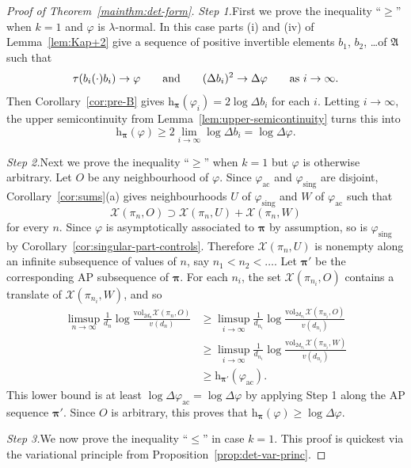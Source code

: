 \documentclass[10pt,a4paper]{amsart}
\newcommand{\A}{\mathfrak{A}}
\newcommand{\X}{\mathcal{X}}
\newcommand{\bspi}{\boldsymbol{\pi}}
\renewcommand{\l}{\lambda}
\renewcommand{\phi}{\varphi}
\renewcommand{\rm}[1]{\mathrm{#1}}
\newcommand{\rmh}{\mathrm{h}}
\newcommand{\vol}{\mathrm{vol}}
\begin{document}
\begin{proof}[Proof of Theorem~\ref{mainthm:det-form}]
\emph{Step 1.}\quad First we prove the inequality ``$\ge$'' when $k=1$ and $\phi$ is $\l$-normal.  In this case parts (i) and (iv) of Lemma~\ref{lem:Kap+2} give a sequence of positive invertible elements $b_1$, $b_2$, \dots of $\A$ such that
\[\tau(b_i(\cdot)b_i) \to \phi \qquad \hbox{and} \qquad (\Delta b_i)^2 \to \Delta \phi \qquad \hbox{as}\ i\to\infty.\]
Then Corollary~\ref{cor:pre-B} gives $\rmh_{\bspi}(\phi_i) = 2\log \Delta b_i$ for each $i$. Letting $i\to \infty$, the upper semicontinuity from Lemma~\ref{lem:upper-semicontinuity} turns this into
\[\rmh_{\bspi}(\phi) \ge 2\lim_{i\to\infty}\log \Delta b_i = \log \Delta \phi.\]

\emph{Step 2.}\quad Next we prove the inequality ``$\ge$'' when $k=1$ but $\phi$ is otherwise arbitrary.  Let $O$ be any neighbourhood of $\phi$.  Since $\phi_{\rm{ac}}$ and $\phi_{\rm{sing}}$ are disjoint,  Corollary~\ref{cor:sums}(a) gives neighbourhoods $U$ of $\phi_{\rm{sing}}$ and $W$ of $\phi_{\rm{ac}}$ such that
\[	\X(\pi_n,O) \supset \X(\pi_n,U) + \X(\pi_n,W)\]
for every $n$.  Since $\phi$ is asymptotically associated to $\bspi$ by assumption, so is $\phi_{\rm{sing}}$ by Corollary~\ref{cor:singular-part-controls}.  Therefore $\X(\pi_n,U)$ is nonempty along an infinite subsequence of values of $n$, say $n_1 < n_2 < \dots$.  Let $\bspi'$ be the corresponding AP subsequence of $\bspi$.  For each $n_i$, the set $\X(\pi_{n_i},O)$ contains a translate of $\X(\pi_{n_i},W)$, and so
\begin{align*}
\limsup_{n\to\infty}\frac{1}{d_n}\log \frac{\vol_{2d_n}\X(\pi_n,O)}{v(d_n)} &\ge\limsup_{i\to\infty}\frac{1}{d_{n_i}}\log \frac{\vol_{2d_{n_i}}\X(\pi_{n_i},O)}{v(d_{n_i})}\\
&\ge \limsup_{i\to\infty}\frac{1}{d_{n_i}}\log \frac{\vol_{2d_{n_i}}\X(\pi_{n_i},W)}{v(d_{n_i})} \\
&\ge \rmh_{\bspi'}(\phi_{\rm{ac}}).
\end{align*}
This lower bound is at least $\log \Delta \phi_{\rm{ac}} = \log\Delta\phi$ by applying Step 1 along the AP sequence $\bspi'$.  Since $O$ is arbitrary, this proves that $\rmh_{\bspi}(\phi)\ge \log \Delta \phi$.

\vspace{7pt}

\emph{Step 3.}\quad We now prove the inequality ``$\le$'' in case $k=1$.  This proof is quickest via the variational principle from Proposition~\ref{prop:det-var-princ}.


\end{proof}
\end{document}
